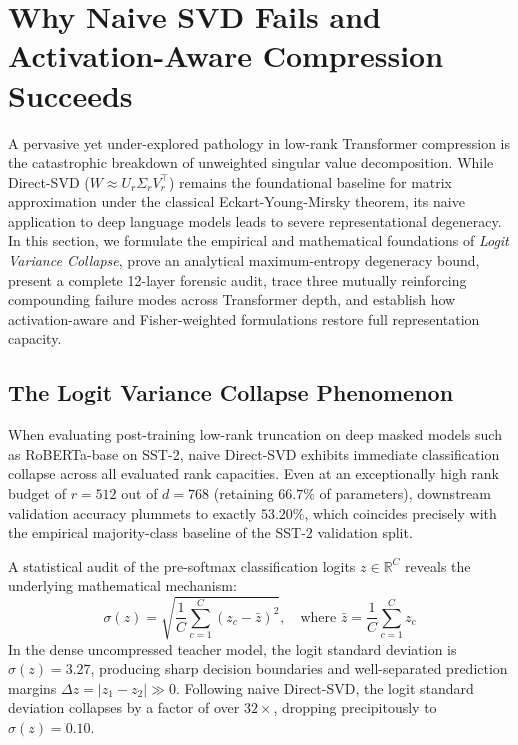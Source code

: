 \documentclass{article}
\begin{document}
\section{Why Naive SVD Fails and Activation-Aware Compression Succeeds}
\label{sec:why_naive_svd_fails}

A pervasive yet under-explored pathology in low-rank Transformer compression is the catastrophic breakdown of unweighted singular value decomposition. While Direct-SVD ($W \approx U_r \Sigma_r V_r^\top$) remains the foundational baseline for matrix approximation under the classical Eckart-Young-Mirsky theorem, its naive application to deep language models leads to severe representational degeneracy. In this section, we formulate the empirical and mathematical foundations of \textit{Logit Variance Collapse}, prove an analytical maximum-entropy degeneracy bound, present a complete 12-layer forensic audit, trace three mutually reinforcing compounding failure modes across Transformer depth, and establish how activation-aware and Fisher-weighted formulations restore full representation capacity.

\subsection{The Logit Variance Collapse Phenomenon}
When evaluating post-training low-rank truncation on deep masked models such as RoBERTa-base \citep{liu2019roberta} on SST-2, naive Direct-SVD exhibits immediate classification collapse across all evaluated rank capacities. Even at an exceptionally high rank budget of $r = 512$ out of $d = 768$ (retaining $66.7\%$ of parameters), downstream validation accuracy plummets to exactly $53.20\%$, which coincides precisely with the empirical majority-class baseline of the SST-2 validation split.

A statistical audit of the pre-softmax classification logits $z \in \mathbb{R}^C$ reveals the underlying mathematical mechanism:
\begin{equation}
    \sigma(z) = \sqrt{\frac{1}{C} \sum_{c=1}^C (z_c - \bar{z})^2}, \quad \text{where } \bar{z} = \frac{1}{C}\sum_{c=1}^C z_c
\end{equation}
In the dense uncompressed teacher model, the logit standard deviation is $\sigma(z) = 3.27$, producing sharp decision boundaries and well-separated prediction margins $\Delta z = |z_1 - z_2| \gg 0$. Following naive Direct-SVD, the logit standard deviation collapses by a factor of over $32\times$, dropping precipitously to $\sigma(z) = 0.10$. 
\end{document}
